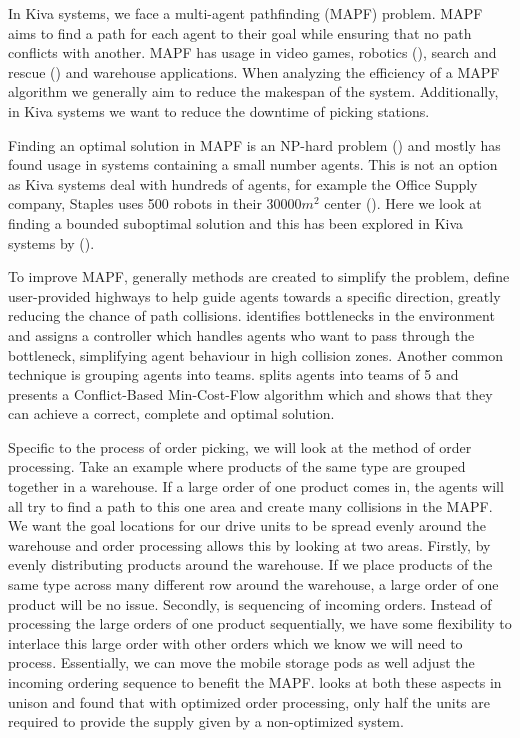 \documentclass[a4paper,11pt]{article}
\begin{document}
In Kiva systems, we face a multi-agent pathfinding (MAPF) problem. MAPF aims to find a path for each agent to their goal while ensuring that no path conflicts with another. MAPF has usage in video games, robotics (\cite{bennewitz2002finding}), search and rescue (\cite{konolige2006centibots}) and warehouse applications. When analyzing the efficiency of a MAPF algorithm we generally aim to reduce the makespan of the system. Additionally, in Kiva systems we want to reduce the downtime of picking stations.

Finding an optimal solution in MAPF is an NP-hard problem (\cite{yu2013structure}) and mostly has found usage in systems containing a small number agents. This is not an option as Kiva systems deal with hundreds of agents, for example the Office Supply company, Staples uses 500 robots in their $30000m^{2}$ center (\cite{guizzo2008three}). Here we look at finding a bounded suboptimal solution and this has been explored in Kiva systems by (\cite{cohen2016bounded}).

To improve MAPF, generally methods are created to simplify the problem, \cite{cohen2016bounded} define user-provided highways to help guide agents towards a specific direction, greatly reducing the chance of path collisions. \cite{wilt2014spatially} identifies bottlenecks in the environment and assigns a controller which handles agents who want to pass through the bottleneck, simplifying agent behaviour in high collision zones. Another common technique is grouping agents into teams. \cite{ma2016optimal} splits agents into teams of 5 and presents a Conflict-Based Min-Cost-Flow algorithm which and shows that they can achieve a correct, complete and optimal solution.


Specific to the process of order picking, we will look at the method of order processing. Take an example where products of the same type are grouped together in a warehouse. If a large order of one product comes in, the agents will all try to find a path to this one area and create many collisions in the MAPF. We want the goal locations for our drive units to be spread evenly around the warehouse and order processing allows this by looking at two areas. Firstly, by evenly distributing products around the warehouse. If we place products of the same type across many different row around the warehouse, a large order of one product will be no issue. Secondly, is sequencing of incoming orders. Instead of processing the large orders of one product sequentially, we have some flexibility to interlace this large order with other orders which we know we will need to process. Essentially, we can move the mobile storage pods as well adjust the incoming ordering sequence to benefit the MAPF. \cite{boysen2017parts} looks at both these aspects in unison and found that with optimized order processing, only half the units are required to provide the supply given by a non-optimized system.
\end{document}
